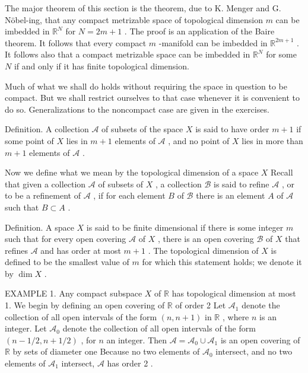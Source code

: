 The major theorem of this section is the theorem, due to K. Menger and G. Nöbel-ing, that any compact metrizable space of topological dimension \(m\) can be imbedded in \({\mathbb{R}}^{N}\) for \(N = {2m} + 1\) . The proof is an application of the Baire theorem. It follows that every compact \(m\) -manifold can be imbedded in \({\mathbb{R}}^{{2m} + 1}\) . It follows also that a compact metrizable space can be imbedded in \({\mathbb{R}}^{N}\) for some \(N\) if and only if it has finite topological dimension.

Much of what we shall do holds without requiring the space in question to be compact. But we shall restrict ourselves to that case whenever it is convenient to do so. Generalizations to the noncompact case are given in the exercises.

Definition. A collection \(\mathcal{A}\) of subsets of the space \(X\) is said to have order \(m + 1\) if some point of \(X\) lies in \(m + 1\) elements of \(\mathcal{A}\) , and no point of \(X\) lies in more than \(m + 1\) elements of \(\mathcal{A}\) .

Now we define what we mean by the topological dimension of a space \(X\) Recall that given a collection \(\mathcal{A}\) of subsets of \(X\) , a collection \(\mathcal{B}\) is said to refine \(\mathcal{A}\) , or to be a refinement of \(\mathcal{A}\) , if for each element \(B\) of \(\mathcal{B}\) there is an element \(A\) of \(\mathcal{A}\) such that \(B \subset  A\) .

Definition. A space \(X\) is said to be finite dimensional if there is some integer \(m\) such that for every open covering \(\mathcal{A}\) of \(X\) , there is an open covering \(\mathcal{B}\) of \(X\) that refines \(\mathcal{A}\) and has order at most \(m + 1\) . The topological dimension of \(X\) is defined to be the smallest value of \(m\) for which this statement holds; we denote it by \(\dim X\) .

EXAMPLE 1. Any compact subspace \(X\) of \(\mathbb{R}\) has topological dimension at most 1. We begin by defining an open covering of \(\mathbb{R}\) of order 2 Let \({\mathcal{A}}_{1}\) denote the collection of all open intervals of the form \(\left( {n,n + 1}\right)\) in \(\mathbb{R}\) , where \(n\) is an integer. Let \({\mathcal{A}}_{0}\) denote the collection of all open intervals of the form \(\left( {n - 1/2,n + 1/2}\right)\) , for \(n\) an integer. Then \(\mathcal{A} = {\mathcal{A}}_{0} \cup  {\mathcal{A}}_{1}\) is an open covering of \(\mathbb{R}\) by sets of diameter one Because no two elements of \({\mathcal{A}}_{0}\) intersect, and no two elements of \({\mathcal{A}}_{1}\) intersect, \(\mathcal{A}\) has order 2 .

